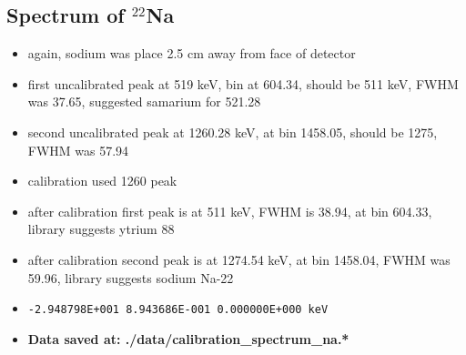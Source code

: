 \documentclass[a4paper]{article}
\begin{document}
\subsection{Spectrum of $^{22}$Na}
\begin{itemize}
    \item again, sodium was place 2.5 cm away from face of detector
    \item first uncalibrated peak at 519 keV, bin at 604.34, should be 511 keV, FWHM was 37.65, suggested samarium for 521.28
    \item second uncalibrated peak at 1260.28 keV, at bin 1458.05, should be 1275, FWHM was 57.94
    \item calibration used 1260 peak
    \item after calibration first peak is at 511 keV, FWHM is 38.94, at bin 604.33, library suggests ytrium 88
    \item after calibration second peak is at 1274.54 keV, at bin 1458.04, FWHM was 59.96, library suggests sodium Na-22
    \item \verb|-2.948798E+001 8.943686E-001 0.000000E+000 keV|
    \item \textbf{Data saved at: ./data/calibration\_spectrum\_na.*}
\end{itemize}
\end{document}
